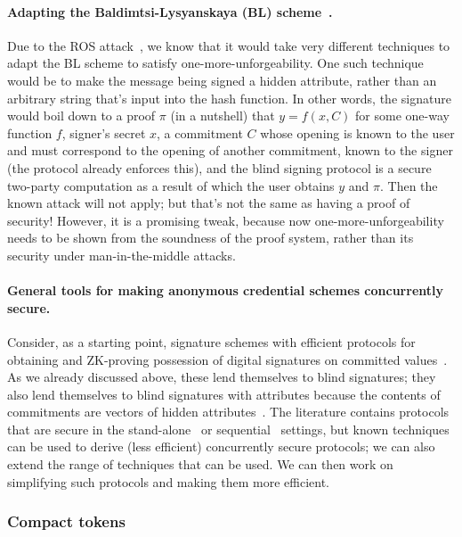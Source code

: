 \paragraph{Adapting the Baldimtsi-Lysyanskaya (BL) scheme~\cite{CCS:BalLys13}.} Due to the ROS attack~\cite{EC:BLLOR21}, we know that it would take very different techniques to adapt the BL scheme to satisfy one-more-unforgeability.  One such technique would be to make the message being signed a hidden attribute, rather than an arbitrary string that's input into the hash function.  In other words, the signature would boil down to a proof $\pi$ (in a nutshell) that $y = f(x,C)$ for some one-way function $f$, signer's secret $x$, a commitment $C$ whose opening is known to the user and must correspond to the opening of another commitment, known to the signer (the protocol already enforces this), and the blind signing protocol is a secure two-party computation as a result of which the user obtains $y$ and $\pi$.  Then the known attack will not apply; but that's not the same as having a proof of security! However, it is a promising tweak, because now one-more-unforgeability needs to be shown from the soundness of the proof system, rather than its security under man-in-the-middle attacks.

\paragraph{General tools for making anonymous credential schemes concurrently secure.} Consider, as a starting point, signature schemes with efficient protocols for obtaining and ZK-proving possession of digital signatures on committed values~\cite{}.  As we already discussed above, these lend themselves to blind signatures; they also lend themselves to blind signatures with attributes because the contents of commitments are vectors of hidden attributes~\cite{}.  The literature contains protocols that are secure in the stand-alone~\cite{} or sequential~\cite{} settings, but known techniques~\cite{} can be used to derive (less efficient) concurrently secure protocols; we can also extend the range of techniques that can be used.  We can then work on simplifying such protocols and making them more efficient.

\subsubsection{Compact tokens}
\label{rg1:compact}

